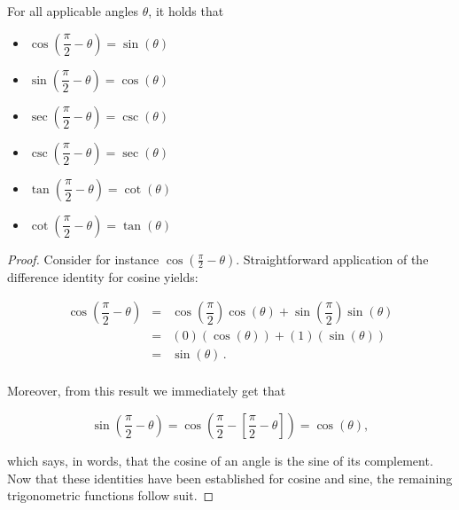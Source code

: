 \ifvc\pagebreak\fi
\begin{theorem} \label{cofunctionidentities}  
For all applicable angles $\theta$, it holds that 
\begin{multicols}{3}
\begin{itemize}
\item  $\cos\left(\dfrac{\pi}{2} - \theta \right) = \sin(\theta)$

\item  $\sin\left(\dfrac{\pi}{2} - \theta \right) = \cos(\theta)$

\item  $\sec\left(\dfrac{\pi}{2} - \theta \right) = \csc(\theta)$

\item  $\csc\left(\dfrac{\pi}{2} - \theta \right) = \sec(\theta)$

\item  $\tan\left(\dfrac{\pi}{2} - \theta \right) = \cot(\theta)$

\item  $\cot\left(\dfrac{\pi}{2} - \theta \right) = \tan(\theta)$
\end{itemize}
\end{multicols}

\vspace{0.1cm}
\end{theorem}
\begin{proof}
Consider for instance $\cos\left(\frac{\pi}{2} - \theta\right)$. Straightforward application of the difference identity for cosine yields:

\[ \begin{array}{rcl}

\cos\left(\dfrac{\pi}{2} - \theta\right) & = & \cos\left(\dfrac{\pi}{2}\right)\cos\left(\theta\right) + \sin\left(\dfrac{\pi}{2}\right)\sin\left(\theta \right) \\ [10pt]
                            & = & \left( 0 \right)\left( \cos(\theta) \right)  +  \left( 1 \right)\left( \sin(\theta) \right) \\ [4pt]
														& = & \sin(\theta) \,.   \\
\end{array} \]

Moreover, from this result we immediately get that 

 \[ \sin\left(\dfrac{\pi}{2} - \theta\right) = \cos\left(\dfrac{\pi}{2} -\left[\dfrac{\pi}{2} - \theta\right]\right) = \cos(\theta),\]

which says, in words, that the cosine of an angle is the sine of its complement.  Now that these identities have been established for cosine and sine, the remaining trigonometric functions follow suit.
\end{proof}

